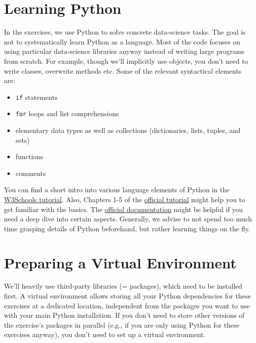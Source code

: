 \documentclass[12pt]{article}
\newcommand{\code}[1]{\textcolor{kitgreen}{\texttt{#1}}}
\begin{document}
\section{Learning Python}

In the exercises, we use Python to solve concrete data-science tasks.
The goal is not to systematically learn Python as a language.
Most of the code focuses on using particular data-science libraries anyway instead of writing large programs from scratch.
For example, though we'll implicitly use objects, you don't need to write classes, overwrite methods etc.
Some of the relevant syntactical elements are:

\begin{itemize}[left=0pt, noitemsep]
	\item \code{if} statements
	\item \code{for} loops and list comprehensions
	\item elementary data types as well as collections (dictionaries, lists, tuples, and sets)
	\item functions
	\item comments
\end{itemize}

You can find a short intro into various language elements of Python in the \href{https://www.w3schools.com/python/default.asp}{W3Schools tutorial}.
Also, Chapters 1-5 of the \href{https://docs.python.org/3.8/tutorial/index.html}{official tutorial} might help you to get familiar with the basics.
The \href{https://docs.python.org/3.8/}{official documentation} might be helpful if you need a deep dive into certain aspects.
Generally, we advise to not spend too much time grasping details of Python beforehand, but rather learning things on the fly.

\section{Preparing a Virtual Environment}
\label{sec:environment}

We'll heavily use third-party libraries (= packages), which need to be installed first.
A virtual environment allows storing all your Python dependencies for these exercises at a dedicated location, independent from the packages you want to use with your main Python installation.
If you don't need to store other versions of the exercise's packages in parallel (e.g., if you are only using Python for these exercises anyway), you don't need to set up a virtual environment.
\end{document}
